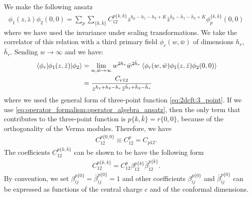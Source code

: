 \documentclass[10pt]{article}
\begin{document}
We make the following ansatz
\begin{align}\label{eq:operator_formalism:operator_algebra_ansatz}
    \phi_1(z,\bar{z})\phi_2(0,0)=\sum_p \sum_{\{k,\bar{k}\}}C^{p\{k,\bar{k}\}}_{12}z^{h_p-h_1-h_2+K}\bar{z}^{\bar{h}_p-\bar{h}_1-\bar{h}_2+\bar{K}}\phi_p^{\{k,\bar{k}\}}(0,0)
\end{align}
where we have used the invariance under scaling transformations.
We take the correlator of this relation with a third primary field $\phi_r(w,\bar{w})$ of dimensions $h_r$, $\bar{h}_r$.
Sending $w\to\infty$ and we have:
\begin{align}
    \mel{\phi_r}{\phi_1(z,\bar{z})}{\phi_2} & =\lim_{w,\bar{w}\to\infty}w^{2h_r}\bar{w}^{2\bar{h}_r}\expval{\phi_r(w,\bar{w})\phi_1(z,\bar{z})\phi_2(0,0)}\notag \\
                                            & =\frac{C_{r12}}{z^{h_1+h_2-h_r}\bar{z}^{\bar{h}_1+\bar{h}_2-\bar{h}_r}}
\end{align}
where we used the general form of three-point function \cref{eq:2dcft:3_point}.
If we use \cref{eq:operator_formalism:operator_algebra_ansatz}, then the only term that contributes to the three-point function is $p\{k,\bar{k}\}=r\{0,0\}$, because of the orthogonality of the Verma modules.
Therefore, we have 
\begin{align}
    C^{p\{0,0\}}_{12}\equiv C^{p}_{12}=C_{p12}.
\end{align}
The coefficients $C^{p\{k,\bar{k}\}}_{12}$ can be shown to be have the following form\cite{Belavin:1984vu}
\begin{align}
    C^{p\{k,\bar{k}\}}_{12}=C^p_{12}\beta^{p\{k\}}_{12}\bar{\beta}^{p\{\bar{k}\}}_{12}.
\end{align}
By convention, we set $\beta^{p\{0\}}_{ij}=\bar{\beta}^{p\{0\}}_{ij}=1$ and other coefficients $\beta^{p\{0\}}_{ij}$ and $\bar{\beta}^{p\{0\}}_{ij}$ can be expressed as functions of the central charge $c$ and of the conformal dimensions.
\end{document}
